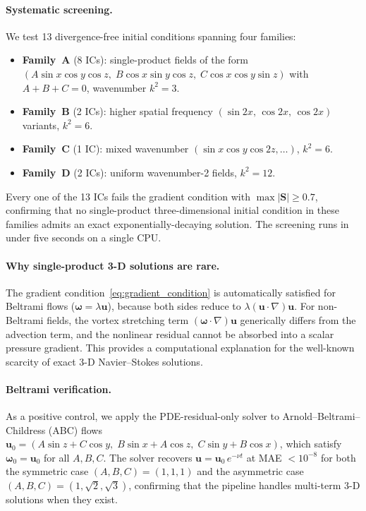 \paragraph{Systematic screening.}
We test 13 divergence-free initial conditions spanning four families:
\begin{itemize}
  \item \textbf{Family~A} (8 ICs): single-product fields of the form
    $(A\sin x\cos y\cos z,\; B\cos x\sin y\cos z,\;
     C\cos x\cos y\sin z)$ with $A+B+C=0$, wavenumber $k^2=3$.
  \item \textbf{Family~B} (2 ICs): higher spatial frequency
    $(\sin 2x,\,\cos 2x,\,\cos 2x)$ variants, $k^2=6$.
  \item \textbf{Family~C} (1 IC): mixed wavenumber
    $(\sin x\cos y\cos 2z,\ldots)$, $k^2=6$.
  \item \textbf{Family~D} (2 ICs): uniform wavenumber-2 fields, $k^2=12$.
\end{itemize}
Every one of the 13 ICs fails the gradient condition with
$\max|\mathbf{S}| \ge 0.7$, confirming that no single-product
three-dimensional initial condition in these families admits an exact
exponentially-decaying solution.  The screening runs in under five seconds
on a single CPU\@.

\paragraph{Why single-product 3-D solutions are rare.}
The gradient condition~\eqref{eq:gradient_condition} is automatically
satisfied for Beltrami flows ($\boldsymbol{\omega} = \lambda\mathbf{u}$),
because both sides reduce to
$\lambda(\mathbf{u}\!\cdot\!\nabla)\mathbf{u}$.  For non-Beltrami fields,
the vortex stretching term $(\boldsymbol{\omega}\!\cdot\!\nabla)\mathbf{u}$
generically differs from the advection term, and the nonlinear residual
cannot be absorbed into a scalar pressure gradient.  This provides a
computational explanation for the well-known scarcity of exact 3-D
Navier--Stokes solutions.

\paragraph{Beltrami verification.}
As a positive control, we apply the PDE-residual-only solver to
Arnold--Beltrami--Childress (ABC) flows
$\mathbf{u}_0 = (A\sin z + C\cos y,\; B\sin x + A\cos z,\;
 C\sin y + B\cos x)$,
which satisfy $\boldsymbol{\omega}_0 = \mathbf{u}_0$ for all $A,B,C$.
The solver recovers $\mathbf{u} = \mathbf{u}_0\,e^{-\nu t}$ at MAE
$< 10^{-8}$ for both the symmetric case $(A,B,C) = (1,1,1)$ and the
asymmetric case $(A,B,C) = (1,\sqrt{2},\sqrt{3})$, confirming that the
pipeline handles multi-term 3-D solutions when they exist.


